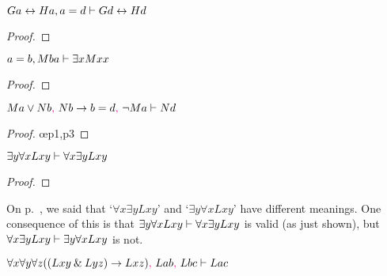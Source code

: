 \begin{earg}
\item $Ga \leftrightarrow Ha, a=d \vdash Gd \leftrightarrow Hd$

\begin{proof}
	 \pr{}
	 \pr{}
	 
\end{proof}
\bigskip

\noindent\begin{minipage}{0.99\textwidth}
\item $a=b, Mba \vdash \exists xMxx$

\begin{proof}
	 \pr{}
	 \pr{}
	 
	 
\end{proof}
\smallskip
\end{minipage}

\noindent\begin{minipage}{0.99\textwidth}
\item $Ma \vee Nb\textcolor{magenta}{,}~ Nb \rightarrow b=d\textcolor{magenta}{,}~ {\neg} Ma  \vdash Nd$

\begin{proof}
	 \pr{}
	 \pr{}
	 \pr{}
	 \oe{p1,p3}
	 
	 
\end{proof}
\medskip
\end{minipage}

\item $\exists y \forall xLxy \vdash \forall x \exists yLxy$

\begin{proof}
	 \pr{}
	\open
		 \as{}
		 
		 
		 
	\close
	 
\end{proof}
\smallskip
On p.~\pageref{quantifier-order}, we said that `$\forall x \exists yLxy$' and `$\exists y \forall xLxy$' have different meanings. One consequence of this is that $\exists y \forall xLxy \vdash \forall x \exists yLxy$ is valid (as just shown), but $\forall x \exists yLxy \vdash \exists y \forall xLxy$ is not. 
\bigskip

\item $\forall x \forall y \forall z((Lxy \mathbin{\&} Lyz) \rightarrow Lxz)\textcolor{magenta}{,}~ Lab\textcolor{magenta}{,}~ Lbc \vdash Lac$
\end{earg}  %

